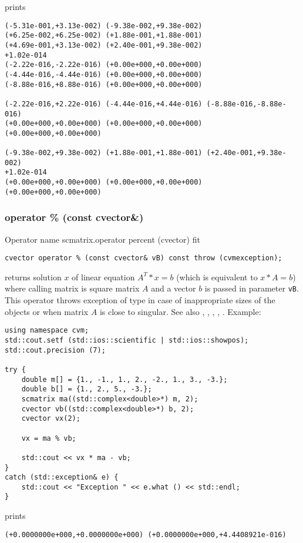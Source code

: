 prints
\begin{Verbatim}
(-5.31e-001,+3.13e-002) (-9.38e-002,+9.38e-002)
(+6.25e-002,+6.25e-002) (+1.88e-001,+1.88e-001)
(+4.69e-001,+3.13e-002) (+2.40e-001,+9.38e-002)
+1.02e-014
(-2.22e-016,-2.22e-016) (+0.00e+000,+0.00e+000)
(-4.44e-016,-4.44e-016) (+0.00e+000,+0.00e+000)
(-8.88e-016,+8.88e-016) (+0.00e+000,+0.00e+000)

(-2.22e-016,+2.22e-016) (-4.44e-016,+4.44e-016) (-8.88e-016,-8.88e-016)
(+0.00e+000,+0.00e+000) (+0.00e+000,+0.00e+000) (+0.00e+000,+0.00e+000)

(-9.38e-002,+9.38e-002) (+1.88e-001,+1.88e-001) (+2.40e-001,+9.38e-002)
+1.02e-014
(+0.00e+000,+0.00e+000) (+0.00e+000,+0.00e+000) (+0.00e+000,+0.00e+000)
\end{Verbatim}
\newpage





\subsubsection{operator \% (const cvector\&)}
Operator%
\pdfdest name {scmatrix.operator percent (cvector)} fit
\begin{verbatim}
cvector operator % (const cvector& vB) const throw (cvmexception);
\end{verbatim}
returns solution $x$ of  linear equation
$A^T*x=b$ (which is equivalent to $x*A=b$) 
where calling matrix is square matrix $A$
and a vector $b$ is passed in parameter \verb"vB".
This operator throws exception 
of type 
in case of inappropriate sizes
of the objects or when  matrix $A$ is close to singular.
See also , 
, 
, 
, .
Example:
\begin{Verbatim}
using namespace cvm;
std::cout.setf (std::ios::scientific | std::ios::showpos);
std::cout.precision (7);

try {
    double m[] = {1., -1., 1., 2., -2., 1., 3., -3.};
    double b[] = {1., 2., 5., -3.};
    scmatrix ma((std::complex<double>*) m, 2);
    cvector vb((std::complex<double>*) b, 2);
    cvector vx(2);

    vx = ma % vb;

    std::cout << vx * ma - vb;
}
catch (std::exception& e) {
    std::cout << "Exception " << e.what () << std::endl;
}
\end{Verbatim}
prints
\begin{Verbatim}
(+0.0000000e+000,+0.0000000e+000) (+0.0000000e+000,+4.4408921e-016)
\end{Verbatim}
\newpage





